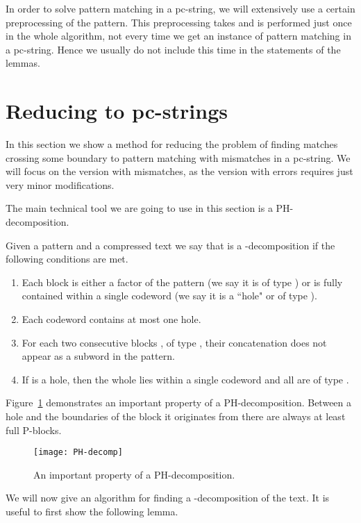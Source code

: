 \documentclass[runningheads]{llncs}
\begin{document}
In order to solve pattern matching in a pc-string, we will extensively use a certain preprocessing of the pattern. This preprocessing takes  and is performed just once in the whole algorithm, not every time we get an instance of pattern matching in a pc-string. Hence we usually do not 
include this time in the statements of the lemmas.

\section{Reducing to pc-strings}
\label{section:reduction}

In this section we show a method for reducing the problem of finding matches crossing some boundary to pattern matching with mismatches in a pc-string. We will focus on the version with mismatches, as the version with errors requires just very minor modifications.

The main technical tool we are going to use in this section is a PH-decomposition.

\begin{definition}
Given a pattern  and a compressed text  we say that  is a -decomposition if the following conditions are met.
\begin{enumerate}
\item{Each block  is either a factor of the pattern (we say it is of type ) or is fully contained within a single codeword (we say it is a ``hole" or of type ).}
\item{Each codeword contains at most one hole.}
\item{For each two consecutive blocks ,  of type , their concatenation  does not appear as a subword in the pattern.}
\item{If  is a hole, then the whole  lies within a single codeword and all  are of type . }
\end{enumerate}
\end{definition}
Figure~\ref{figure:PH-decomp} demonstrates an important property of a PH-decomposition. Between a hole and the boundaries of the block it originates from there are always at least  full P-blocks.

\begin{figure}[t]
\texttt{[image: PH-decomp]}
\caption{An important property of a PH-decomposition.}
\label{figure:PH-decomp}
\end{figure}

We will now give an algorithm for finding a -decomposition of the text. It is useful to first show the following lemma.
\end{document}
